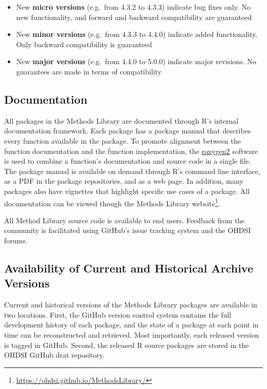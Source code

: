 \documentclass[11pt]{book}
\providecommand{\tightlist}{%
  \setlength{\itemsep}{0pt}\setlength{\parskip}{0pt}}
\let\rmarkdownfootnote\footnote%
\def\footnote{\protect\rmarkdownfootnote}
\theoremstyle{definition}
\theoremstyle{definition}
\theoremstyle{definition}
\theoremstyle{remark}
\begin{document}
\begin{itemize}
\tightlist
\item
  New \textbf{micro versions} (e.g.~from 4.3.2 to 4.3.3) indicate bug fixes only. No new functionality, and forward and backward compatibility are guaranteed
\item
  New \textbf{minor versions} (e.g.~from 4.3.3 to 4.4.0) indicate added functionality. Only backward compatibility is guaranteed
\item
  New \textbf{major versions} (e.g.~from 4.4.0 to 5.0.0) indicate major revisions. No guarantees are made in terms of compatibility
\end{itemize}

\hypertarget{documentation-2}{%
\subsection{Documentation}\label{documentation-2}}

All packages in the Methods Library are documented through R's internal documentation framework. Each package has a package manual that describes every function available in the package. To promote alignment between the function documentation and the function implementation, the \href{https://cran.r-project.org/web/packages/roxygen2/vignettes/roxygen2.html}{roxygen2} software is used to combine a function's documentation and source code in a single file. The package manual is available on demand through R's command line interface, as a PDF in the package repositories, and as a web page. In addition, many packages also have vignettes that highlight specific use cases of a package. All documentation can be viewed though the Methods Library website\footnote{\url{https://ohdsi.github.io/MethodsLibrary/}}.

All Method Library source code is available to end users. Feedback from the community is facilitated using GitHub's issue tracking system and the OHDSI forums.

\hypertarget{availability-of-current-and-historical-archive-versions}{%
\subsection{Availability of Current and Historical Archive Versions}\label{availability-of-current-and-historical-archive-versions}}

Current and historical versions of the Methods Library packages are available in two locations. First, the GitHub version control system contains the full development history of each package, and the state of a package at each point in time can be reconstructed and retrieved. Most importantly, each released version is tagged in GitHub. Second, the released R source packages are stored in the OHDSI GitHub drat repository.
\end{document}
